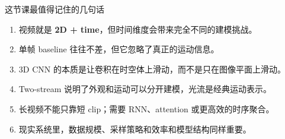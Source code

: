 \begin{importantbox}{这节课最值得记住的几句话}
\begin{enumerate}
    \item 视频就是 \textbf{2D + time}，但时间维度会带来完全不同的建模挑战。
    \item 单帧 baseline 往往不差，但它忽略了真正的运动信息。
    \item 3D CNN 的本质是让卷积在时空体上滑动，而不是只在图像平面上滑动。
    \item Two-stream 说明了外观和运动可以分开建模，光流是经典运动表示。
    \item 长视频不能只靠短 clip；需要 RNN、attention 或更高效的时序聚合。
    \item 现实系统里，数据规模、采样策略和效率和模型结构同样重要。
\end{enumerate}
\end{importantbox}

